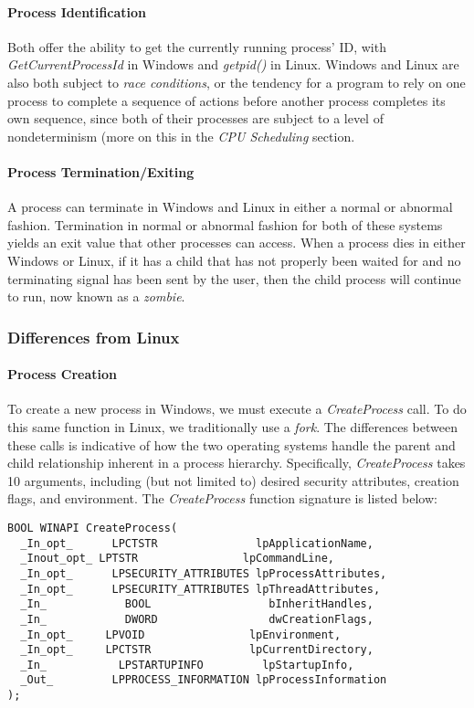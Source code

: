 \documentclass[letterpaper,10pt,titlepage]{article}
\begin{document}
\paragraph{Process Identification}
Both offer the ability to get the currently running process' ID, with \emph{GetCurrentProcessId} in Windows and \emph{getpid()} in Linux. Windows and Linux are also both subject to \emph{race conditions}, or the tendency for a program to rely on one process to complete a sequence of actions before another process completes its own sequence, since both of their processes are subject to a level of nondeterminism (more on this in the \emph{CPU Scheduling} section.
\paragraph{Process Termination/Exiting}
A process can terminate in Windows and Linux in either a normal or abnormal fashion. Termination in normal or abnormal fashion for both of these systems yields an exit value that other processes can access. When a process dies in either Windows or Linux, if it has a child that has not properly been waited for and no terminating signal has been sent by the user, then the child process will continue to run, now known as a \emph{zombie}. 
\subsubsection{Differences from Linux}
\paragraph{Process Creation} To create a new process in Windows, we must execute a \emph{CreateProcess} call. To do this same function in Linux, we traditionally use a \emph{fork}. The differences between these calls is indicative of how the two operating systems handle the parent and child relationship inherent in a process hierarchy. Specifically, \emph{CreateProcess} takes 10 arguments, including (but not limited to) desired security attributes, creation flags, and environment. The \emph{CreateProcess} function signature is listed below:
\begin{lstlisting}
BOOL WINAPI CreateProcess(
  _In_opt_      LPCTSTR               lpApplicationName,
  _Inout_opt_ LPTSTR                lpCommandLine,
  _In_opt_      LPSECURITY_ATTRIBUTES lpProcessAttributes,
  _In_opt_      LPSECURITY_ATTRIBUTES lpThreadAttributes,
  _In_            BOOL                  bInheritHandles,
  _In_            DWORD                 dwCreationFlags,
  _In_opt_     LPVOID                lpEnvironment,
  _In_opt_     LPCTSTR               lpCurrentDirectory,
  _In_           LPSTARTUPINFO         lpStartupInfo,
  _Out_         LPPROCESS_INFORMATION lpProcessInformation
);
\end{lstlisting}
\end{document}
